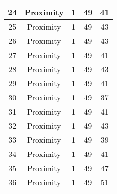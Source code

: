 \documentclass[results.tex]{subfiles}
\begin{document}
\begin{center}
\begin{tabular}{| c || c | c | c | c |}
            \hline
            24                      & Proximity                    & 1                      & 49                      & 41                   \\
            \hline
            25                      & Proximity                    & 1                      & 49                      & 43                   \\
            \hline
            26                      & Proximity                    & 1                      & 49                      & 43                   \\
            \hline
            27                      & Proximity                    & 1                      & 49                      & 41                   \\
            \hline
            28                      & Proximity                    & 1                      & 49                      & 43                   \\
            \hline
            29                      & Proximity                    & 1                      & 49                      & 41                   \\
            \hline
            30                      & Proximity                    & 1                      & 49                      & 37                   \\
            \hline
            31                      & Proximity                    & 1                      & 49                      & 41                   \\
            \hline
            32                      & Proximity                    & 1                      & 49                      & 43                   \\
            \hline
            33                      & Proximity                    & 1                      & 49                      & 39                   \\
            \hline
            34                      & Proximity                    & 1                      & 49                      & 41                   \\
            \hline
            35                      & Proximity                    & 1                      & 49                      & 47                   \\
            \hline
            36                      & Proximity                    & 1                      & 49                      & 51                   \\

\end{tabular}
\end{center}
\end{document}
